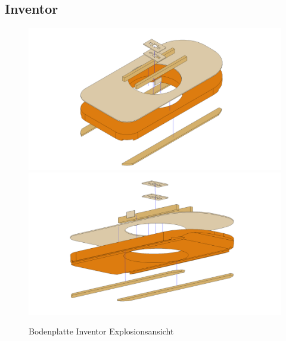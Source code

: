 \subsection{Inventor}
\begin{figure}[H]
    \centering
    \includegraphics[width=\textwidth]{../Inventor/Bodenplatte/png/Bodenplatte_Praesentation_Hauptansicht.png}
    \includegraphics[width=\textwidth]{../Inventor/Bodenplatte/png/Bodenplatte_Praesentation_SeitlichUnten.png}
    \label{fig:konst:bodenplatte:inventor}
    \caption{Bodenplatte Inventor Explosionsansicht}
\end{figure}
\clearpage

